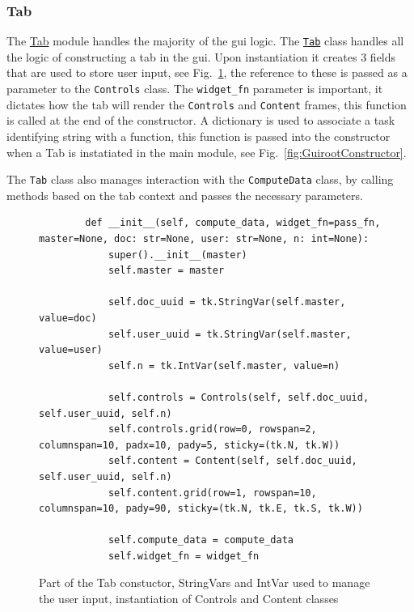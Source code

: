 \documentclass[11pt]{article}
\newcommand{\code}[1]{\colorbox{light-gray}{\texttt{#1}}}
\begin{document}
\subsubsection{Tab}
The \href{https://www2.macs.hw.ac.uk/~sf52/DocuTrace/html/DocuTrace.Gui.html#module-DocuTrace.Gui.Tab}{Tab} module handles the majority of the gui logic. The \href{https://www2.macs.hw.ac.uk/~sf52/DocuTrace/html/DocuTrace.Gui.html#DocuTrace.Gui.Tab.Tab}{\code{Tab}} class handles all the logic of constructing a tab in the gui.
Upon instantiation it creates 3 fields that are used to store user input, see Fig.~\ref{fig:TabConstuctor}, the reference to these is passed as a parameter to the \code{Controls} class.
The \code{widget\_fn} parameter is important, it dictates how the tab will render the \code{Controls} and \code{Content} frames, this function is called at the end of the constructor.
A dictionary is used to associate a task identifying string with a function, this function is passed into the constructor when a Tab is instatiated in the main module, see Fig.~\ref{fig:GuirootConstructor}.

The \code{Tab} class also manages interaction with the \code{ComputeData} class, by calling methods based on the tab context and passes the necessary parameters.

\begin{figure}[h]
    \begin{verbatim}
        def __init__(self, compute_data, widget_fn=pass_fn, master=None, doc: str=None, user: str=None, n: int=None):
            super().__init__(master)
            self.master = master

            self.doc_uuid = tk.StringVar(self.master, value=doc)
            self.user_uuid = tk.StringVar(self.master, value=user)
            self.n = tk.IntVar(self.master, value=n)

            self.controls = Controls(self, self.doc_uuid, self.user_uuid, self.n)
            self.controls.grid(row=0, rowspan=2, columnspan=10, padx=10, pady=5, sticky=(tk.N, tk.W))
            self.content = Content(self, self.doc_uuid, self.user_uuid, self.n)
            self.content.grid(row=1, rowspan=10, columnspan=10, pady=90, sticky=(tk.N, tk.E, tk.S, tk.W))

            self.compute_data = compute_data
            self.widget_fn = widget_fn
    \end{verbatim}
    \caption{Part of the Tab constuctor, StringVars and IntVar used to manage the user input, instantiation of Controls and Content classes}
    \label{fig:TabConstuctor}
\end{figure}
\end{document}
